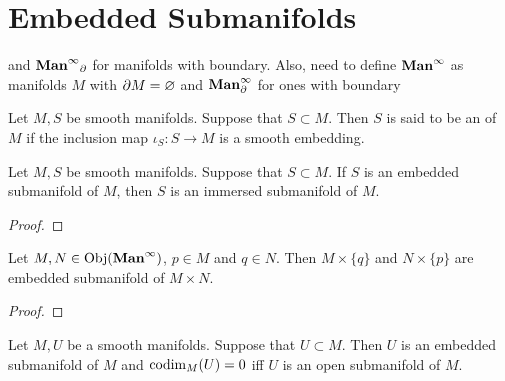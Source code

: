 \documentclass{book}
\begin{document}
	
	

	
	
	
	
	
	
	
	
	
	\newpage
	\section{Embedded Submanifolds}
	
	 and $\operatorname*{\text{\textbf{Man}}^{\infty}}_{\partial}$ for manifolds with boundary. Also, need to define $\operatorname*{\text{\textbf{Man}}^{\infty}}$ as manifolds $M$ with $\partial M = \varnothing$ and $\operatorname*{\text{\textbf{Man}}^{\infty}_{\partial}}$ for ones with boundary

	\begin{defn} 
		Let $M, S$ be smooth manifolds. Suppose that $S \subset M$. Then $S$ is said to be an  of $M$ if the inclusion map $\iota_S:S \rightarrow M$ is a smooth embedding.
	\end{defn}

	\begin{ex} 
		Let $M, S$ be smooth manifolds. Suppose that $S \subset M$. If $S$ is an embedded submanifold of $M$, then $S$ is an immersed submanifold of $M$.
	\end{ex}

	\begin{proof}
	\end{proof}

	\begin{ex} 
		Let $M, N \in \operatorname{Obj}(\operatorname*{\text{\textbf{Man}}^{\infty}})$, $p \in M$ and $q \in N$. Then $M \times \{q\}$ and $N \times \{p\}$ are embedded submanifold of $M \times N$. 
	\end{ex}

	\begin{proof}
	\end{proof}

	\begin{ex} 
		Let $M, U$ be a smooth manifolds. Suppose that $U \subset M$. Then $U$ is an embedded submanifold of $M$ and $\operatorname{codim}_M(U) = 0$ iff $U$ is an open submanifold of $M$. 
	\end{ex}
\end{document}
